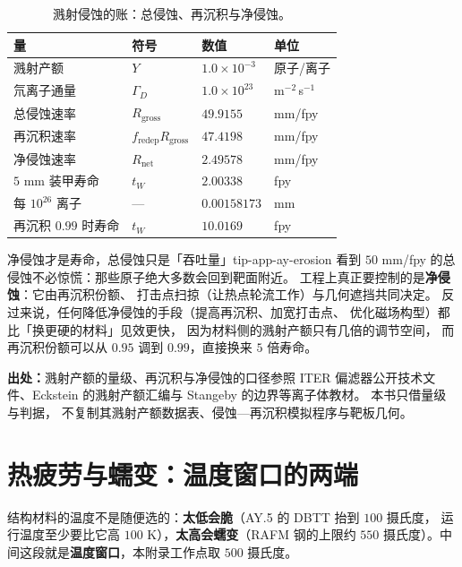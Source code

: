 \begin{table}[htbp]
\centering
\small
\setlength{\tabcolsep}{4pt}
\caption{溅射侵蚀的账：总侵蚀、再沉积与净侵蚀。}
\label{tab:app-ay-erosion}
\begin{tabular}{p{4.6cm}p{2.8cm}p{3.0cm}p{2.6cm}}
\toprule
量 & 符号 & 数值 & 单位 \\
\midrule
溅射产额 & $Y$ & $1.0\times10^{-3}$ & 原子/离子 \\
氘离子通量 & $\Gamma_D$ & $1.0\times10^{23}$ & m$^{-2}$\,s$^{-1}$ \\
总侵蚀速率 & $R_\mathrm{gross}$ & $49.9155$ & mm/fpy \\
再沉积速率 & $f_\mathrm{redep}R_\mathrm{gross}$ & $47.4198$ & mm/fpy \\
净侵蚀速率 & $R_\mathrm{net}$ & $2.49578$ & mm/fpy \\
$5$ mm 装甲寿命 & $t_W$ & $2.00338$ & fpy \\
每 $10^{26}$ 离子 & --- & $0.00158173$ & mm \\
再沉积 $0.99$ 时寿命 & $t_W$ & $10.0169$ & fpy \\
\bottomrule
\end{tabular}

\end{table}

\begin{tip}{净侵蚀才是寿命，总侵蚀只是「吞吐量」}{tip-app-ay-erosion}
看到 $50$ mm/fpy 的总侵蚀不必惊慌：那些原子绝大多数会回到靶面附近。
工程上真正要控制的是\textbf{净侵蚀}：它由再沉积份额、
打击点扫掠（让热点轮流工作）与几何遮挡共同决定。
反过来说，任何降低净侵蚀的手段（提高再沉积、加宽打击点、
优化磁场构型）都比「换更硬的材料」见效更快，
因为材料侧的溅射产额只有几倍的调节空间，
而再沉积份额可以从 $0.95$ 调到 $0.99$，直接换来 $5$ 倍寿命。
\end{tip}

{\footnotesize
\textbf{出处：}溅射产额的量级、再沉积与净侵蚀的口径参照
ITER 偏滤器公开技术文件、Eckstein 的溅射产额汇编与
Stangeby 的边界等离子体教材。
本书只借量级与判据，
不复制其溅射产额数据表、侵蚀—再沉积模拟程序与靶板几何。
\section{热疲劳与蠕变：温度窗口的两端}
\label{sec:app-ay-window}
}

结构材料的温度不是随便选的：\textbf{太低会脆}（AY.5 的 DBTT 抬到 $100$ 摄氏度，
运行温度至少要比它高 $100$ K），\textbf{太高会蠕变}（RAFM 钢的上限约
$550$ 摄氏度）。中间这段就是\textbf{温度窗口}，本附录工作点取 $500$ 摄氏度。

